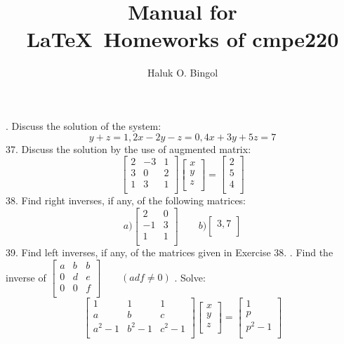 \documentclass[11pt]{amsbook}
\title{
	Manual for\\
	\LaTeX\ Homeworks of cmpe220\\
	{\footnotesize \hbTimeStamp}
}
\author{Haluk O. Bingol}
\date{}                                           %
\begin{document}

. Discuss the solution of the system:
\[
    y + z = 1,  2x -2y -z = 0,  4x + 3y +5z = 7
\]
37. Discuss the solution by the use of augmented matrix:
\[
 \begin{bmatrix}
    2  & -3 &  1 \\
    3  & 0 &  2 \\
    1  & 3 &  1 \\
\end{bmatrix} 
 \begin{bmatrix}
    x  \\
    y  \\
    z  \\
\end{bmatrix}
=
\begin{bmatrix}
    2  \\
    5  \\
    4  \\
\end{bmatrix}
\]
38. Find right inverses, if any, of the following matrices:
\[
a) 
 \begin{bmatrix}
    2  & 0 \\
    -1  & 3  \\
    1  & 1  \\
\end{bmatrix}
\qquad b) 
 \begin{bmatrix}
    3, 7 \\
\end{bmatrix}
\]
39. Find left inverses, if any, of the matrices given in Exercise 38. . Find the inverse of $
 \begin{bmatrix}
    a  & b &  b \\
    0  & d &  e \\
    0  & 0 &  f \\
\end{bmatrix}
\qquad (adf \neq 0)
$ . Solve:
\[
 \begin{bmatrix}
    1  & 1 &  1 \\
    a  & b &  c \\
    a^2-1  & b^2-1 &  c^2-1 \\
\end{bmatrix} 
 \begin{bmatrix}
    x  \\
    y  \\
    z  \\
\end{bmatrix}
=
\begin{bmatrix}
    1  \\
    p  \\
    p^2-1  \\
\end{bmatrix}
\]
\end{document}
